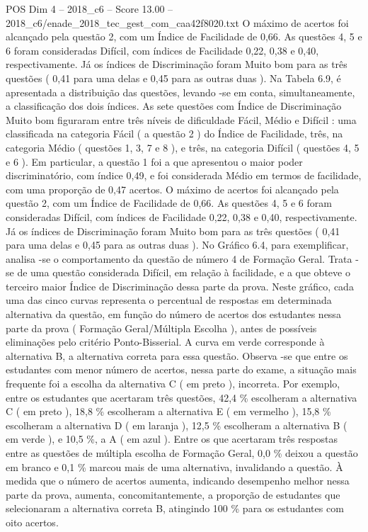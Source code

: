 \begin{textsample}{POS Dim 4 – 2018\_c6 – Score 13.00 – 2018\_c6/enade\_2018\_tec\_gest\_com\_caa42f8020.txt}
O máximo de acertos foi alcançado pela questão 2, com um Índice de Facilidade de 0,66.
As questões 4, 5 e 6 foram consideradas Difícil, com índices de Facilidade 0,22, 0,38 e 0,40, respectivamente.
Já os índices de Discriminação foram Muito bom para as três questões ( 0,41 para uma delas e 0,45 para as outras duas ).
Na Tabela 6.9, é apresentada a distribuição das questões, levando -se em conta, simultaneamente, a classificação dos dois índices.
As sete questões com Índice de Discriminação Muito bom figuraram entre três níveis de dificuldade Fácil, Médio e Difícil : uma classificada na categoria Fácil ( a questão 2 ) do Índice de Facilidade, três, na categoria Médio ( questões 1, 3, 7 e 8 ), e três, na categoria Difícil ( questões 4, 5 e 6 ).
Em particular, a questão 1 foi a que apresentou o maior poder discriminatório, com índice 0,49, e foi considerada Médio em termos de facilidade, com uma proporção de 0,47 acertos.
O máximo de acertos foi alcançado pela questão 2, com um Índice de Facilidade de 0,66.
As questões 4, 5 e 6 foram consideradas Difícil, com índices de Facilidade 0,22, 0,38 e 0,40, respectivamente.
Já os índices de Discriminação foram Muito bom para as três questões ( 0,41 para uma delas e 0,45 para as outras duas ).
No Gráfico 6.4, para exemplificar, analisa -se o comportamento da questão de número 4 de Formação Geral.
Trata -se de uma questão considerada Difícil, em relação à facilidade, e a que obteve o terceiro maior Índice de Discriminação dessa parte da prova.
Neste gráfico, cada uma das cinco curvas representa o percentual de respostas em determinada alternativa da questão, em função do número de acertos dos estudantes nessa parte da prova ( Formação Geral/Múltipla Escolha ), antes de possíveis eliminações pelo critério Ponto-Bisserial.
A curva em verde corresponde à alternativa B, a alternativa correta para essa questão.
Observa -se que entre os estudantes com menor número de acertos, nessa parte do exame, a situação mais frequente foi a escolha da alternativa C ( em preto ), incorreta.
Por exemplo, entre os estudantes que acertaram três questões, 42,4 \% escolheram a alternativa C ( em preto ), 18,8 \% escolheram a alternativa E ( em vermelho ), 15,8 \% escolheram a alternativa D ( em laranja ), 12,5 \% escolheram a alternativa B ( em verde ), e 10,5 \%, a A ( em azul ).
Entre os que acertaram três respostas entre as questões de múltipla escolha de Formação Geral, 0,0 \% deixou a questão em branco e 0,1 \% marcou mais de uma alternativa, invalidando a questão.
À medida que o número de acertos aumenta, indicando desempenho melhor nessa parte da prova, aumenta, concomitantemente, a proporção de estudantes que selecionaram a alternativa correta B, atingindo 100 \% para os estudantes com oito acertos.

\end{textsample}
